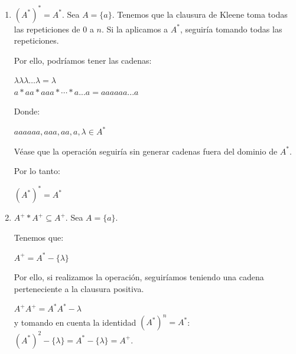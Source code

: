 \begin{enumerate}
        Para $n, \forall n \geq 1$:
        \begin{center}
            $(A^*)^n = (A^*)^{n-1} A^* = (A^*)^{n-2}A^*A^* = \dotsm = A^*$
        \end{center}
        
        Por lo tanto, queda demostrado:
        \begin{center}
            $\boxed{A^* = (A^*)^n, \forall n \geq 1}$
        \end{center}
    \item $(A^*)^* = A^*$.
        \subitem Sea $A = \{a\}$. Tenemos que la clausura de Kleene toma todas las repeticiones de $0$ a $n$. Si la aplicamos a $A^*$, seguiría tomando todas las repeticiones. 
        
        Por ello, podríamos tener las cadenas:
        \begin{center}
            $\lambda\lambda\lambda\ldots\lambda = \lambda$\\
            $a * aa * aaa * \dotsm * a...a = aaaaaa...a$
        \end{center}
        Donde:
        \begin{center}
            $aaaaaa,aaa,aa,a,\lambda \in A^*$
        \end{center}
        
        Véase que la operación seguiría sin generar cadenas fuera del dominio de $A^*$.
        
        Por lo tanto:
        \begin{center}
            $\boxed{(A^*)^* = A^*}$
        \end{center}
    \item $A^+ * A^+ \subseteq A^+$.
        \subitem Sea $A = \{a\}$.
        
        Tenemos que:
        \begin{center}
            $A^+ = A^* - \{\lambda\}$
        \end{center}
        
        Por ello, si realizamos la operación, seguiríamos teniendo una cadena perteneciente a la clausura positiva.
        \begin{center}
            $A^+A^+ = A^*A^* - {\lambda}$\\
            y tomando en cuenta la identidad $(A^*)^n = A^*$:\\
            $(A^*)^2 - \{\lambda\} = A^* - \{\lambda\} = A^+$.
        \end{center}
        

\end{enumerate}
